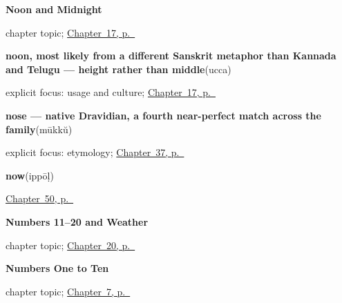 \noindent\begin{minipage}[t]{\linewidth}
\raggedright
\textbf{Noon and Midnight}\par
\footnotesize chapter topic; \hyperref[ch:ml-noon-and-midnight]{Chapter~17, p.~\pageref*{ch:ml-noon-and-midnight}}
\end{minipage}\par\smallskip

\noindent\begin{minipage}[t]{\linewidth}
\raggedright
\textbf{noon, most likely from a different Sanskrit metaphor than Kannada and Telugu — height rather than middle}\enspace\emph{}\enspace(ucca)\par
\footnotesize explicit focus: usage and culture; \hyperref[ch:ml-noon-and-midnight]{Chapter~17, p.~\pageref*{ch:ml-noon-and-midnight}}
\end{minipage}\par\smallskip

\noindent\begin{minipage}[t]{\linewidth}
\raggedright
\textbf{nose — native Dravidian, a fourth near-perfect match across the family}\enspace\emph{}\enspace(mūkkŭ)\par
\footnotesize explicit focus: etymology; \hyperref[ch:ml-face-words]{Chapter~37, p.~\pageref*{ch:ml-face-words}}
\end{minipage}\par\smallskip

\noindent\begin{minipage}[t]{\linewidth}
\raggedright
\textbf{now}\enspace\emph{}\enspace(ippōḷ)\par
\footnotesize \hyperref[ch:ml-taking-leave]{Chapter~50, p.~\pageref*{ch:ml-taking-leave}}
\end{minipage}\par\smallskip

\noindent\begin{minipage}[t]{\linewidth}
\raggedright
\textbf{Numbers 11–20 and Weather}\par
\footnotesize chapter topic; \hyperref[ch:ml-numbers-and-weather]{Chapter~20, p.~\pageref*{ch:ml-numbers-and-weather}}
\end{minipage}\par\smallskip

\noindent\begin{minipage}[t]{\linewidth}
\raggedright
\textbf{Numbers One to Ten}\par
\footnotesize chapter topic; \hyperref[ch:ml-numbers-one-to-ten]{Chapter~7, p.~\pageref*{ch:ml-numbers-one-to-ten}}
\end{minipage}\par\smallskip

